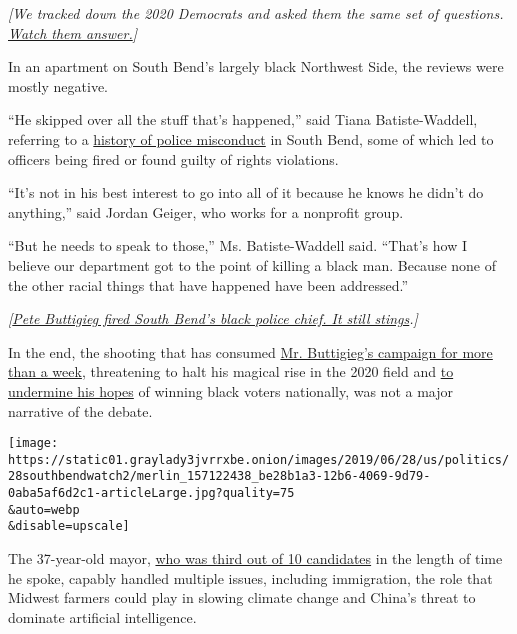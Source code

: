 \emph{{[}We tracked down the 2020 Democrats and asked them the same set
of questions.}
\emph{\href{https://www.nytimes3xbfgragh.onion/interactive/2019/us/politics/2020-candidate-interviews.html?action=click\&module=Intentional\&pgtype=Article}{Watch
them answer.}{]}}

In an apartment on South Bend's largely black Northwest Side, the
reviews were mostly negative.

``He skipped over all the stuff that's happened,'' said Tiana
Batiste-Waddell, referring to a
\href{https://www.nytimes3xbfgragh.onion/2019/06/18/us/politics/buttigieg-police-black-community.html}{history
of police misconduct} in South Bend, some of which led to officers being
fired or found guilty of rights violations.

``It's not in his best interest to go into all of it because he knows he
didn't do anything,'' said Jordan Geiger, who works for a nonprofit
group.

``But he needs to speak to those,'' Ms. Batiste-Waddell said. ``That's
how I believe our department got to the point of killing a black man.
Because none of the other racial things that have happened have been
addressed.''

\emph{{[}}\href{https://www.nytimes3xbfgragh.onion/2019/04/19/us/politics/buttigieg-black-police-chief-fired.html}{\emph{Pete
Buttigieg fired South Bend's black police chief. It still
stings}}\emph{.{]}}

In the end, the shooting that has consumed
\href{https://www.nytimes3xbfgragh.onion/2019/06/18/us/politics/buttigieg-south-bend-police-shooting.html}{Mr.
Buttigieg's campaign for more than a week}, threatening to halt his
magical rise in the 2020 field and
\href{https://www.nytimes3xbfgragh.onion/2019/06/21/us/politics/buttigieg-south-bend-shooting.html}{to
undermine his hopes} of winning black voters nationally, was not a major
narrative of the debate.

\texttt{[image: https://static01.graylady3jvrrxbe.onion/images/2019/06/28/us/politics/28southbendwatch2/merlin\_157122438\_be28b1a3-12b6-4069-9d79-0aba5af6d2c1-articleLarge.jpg?quality=75\\\&auto=webp\\\&disable=upscale]}

The 37-year-old mayor,
\href{https://www.nytimes3xbfgragh.onion/interactive/2019/06/27/us/elections/debate-speaking-time.html}{who
was third out of 10 candidates} in the length of time he spoke, capably
handled multiple issues, including immigration, the role that Midwest
farmers could play in slowing climate change and China's threat to
dominate artificial intelligence.


